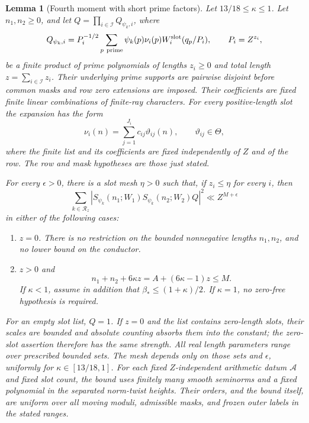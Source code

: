 \documentclass[12pt]{article}
\newtheorem{lemma}[theorem]{Lemma}
\begin{document}
\begin{lemma}[Fourth moment with short prime factors]\label{lem:plain}
Let \(13/18\le\kappa\le1\).  Let \(n_1,n_2\ge0\), and let
\(Q=\prod_{i\in\mathcal I}Q_{\psi_k,i}\), where
\[
 Q_{\psi_k,i}=P_i^{-1/2}\sum_{p\ {\rm prime}}
       \psi_k(p)\nu_i(p)W_i^{\rm slot}(q_p/P_i),\qquad P_i=Z^{z_i},
\]
be a finite product of prime polynomials of lengths
\(z_i\ge0\) and total length \(z=\sum_{i\in\mathcal I}z_i\).
Their underlying prime supports are pairwise disjoint before common
masks and row zero extensions are imposed.  Their coefficients are
fixed finite linear combinations of finite-ray characters.  For every
positive-length slot the expansion has the form
\[
 \nu_i(n)=\sum_{j=1}^{J_i}c_{ij}\vartheta_{ij}(n),
 \qquad \vartheta_{ij}\in\Theta,
\]
where the finite list and its coefficients are fixed independently of
\(Z\) and of the row.  The row and mask hypotheses are those just stated.

For every \(\epsilon>0\), there is a slot mesh \(\eta>0\) such that,
if \(z_i\le\eta\) for every \(i\), then
\begin{equation}
 \sum_{k\in\mathcal R_z}
 \left|S_{\psi_k}(n_1;W_1)S_{\psi_k}(n_2;W_2)Q\right|^2
 \ll Z^{M+\epsilon}
 \label{old-eq:2.1}
\end{equation}
in either of the following cases:
\begin{enumerate}
\item \(z=0\).  There is no restriction on the bounded nonnegative
      lengths \(n_1,n_2\), and no lower bound on the conductor.
\item \(z>0\) and
\begin{equation}
 n_1+n_2+6\kappa z=A+(6\kappa-1)z\le M.
 \label{old-eq:3.9}
\end{equation}
      If \(\kappa<1\), assume in addition that
      \(\beta_*\le(1+\kappa)/2\).  If \(\kappa=1\), no zero-free
      hypothesis is required.
\end{enumerate}
For an empty slot list, \(Q=1\).  If \(z=0\) and the list contains
zero-length slots, their scales are bounded and absolute counting
absorbs them into the constant; the zero-slot assertion therefore
has the same strength.  All real length parameters range over prescribed bounded
sets.  The mesh depends only on those sets and \(\epsilon\), uniformly
for \(\kappa\in[13/18,1]\).  For each fixed \(Z\)-independent arithmetic
datum \(\mathcal A\) and fixed slot count, the bound uses finitely many
smooth seminorms and a fixed polynomial in the separated norm-twist
heights.  Their orders, and the bound itself, are uniform over all
moving moduli, admissible masks, and frozen outer labels in the stated
ranges.
\end{lemma}
\end{document}
